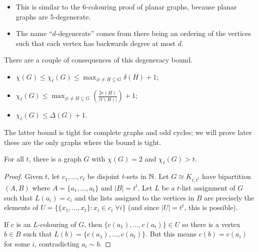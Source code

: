 \documentclass[main.tex]{subfiles}
\begin{document}
\begin{remark*}
  \listhack
  \begin{itemize}
    \item This is similar to the 6-colouring proof of planar graphs,
      because planar graphs are 5-degenerate.

    \item The name ``$d$-degenerate'' comes from there being an ordering of
      the vertices such that each vertex has backwards degree at most $d$.
  \end{itemize}
\end{remark*}
There are a couple of consequences of this degeneracy bound.
\begin{corollary}
  \listhack
  \begin{itemize}
    \item $\chi(G)\leq\chi_\ell(G)\leq\max_{\varnothing\neq H\subseteq G}\delta(H) + 1$;

    \item $\chi_\ell(G)\leq\max_{\varnothing\neq H\subseteq G}
      \left(\frac{2e(H)}{|V(H)|}\right)+1$; 

    \item $\chi_\ell(G)\leq\Delta(G) + 1$.
  \end{itemize}
\end{corollary}
The latter bound is tight for complete graphs and odd cycles;
we will prove later these are the only graphs where the bound is tight.

\begin{theorem} %
  For all $t$, there is a graph $G$ with $\chi(G) = 2$ and $\chi_\ell(G) > t$.
\end{theorem}
\begin{proof}
  Given $t$, let $c_1,\ldots,c_t$ be disjoint $t$-sets in $\mathbb N$.
  Let $G\cong K_{t,t^t}$ have bipartition $(A,B)$ where $A = \{a_1,\ldots,a_t\}$
  and $|B| = t^t$.
  Let $L$ be a $t$-list assignment of $G$ such that $L(a_i) = c_i$ and the lists
  assigned to the vertices in $B$ are precisely the elements of
  $U = \{\{x_1,\ldots,x_t\} : x_i\in c_i\;\forall i\}$ (and since $|U| = t^t$,
  this is possible).

  If $c$ is an $L$-colouring of $G$, then $\{c(a_1),\ldots,c(a_t)\}\in U$
  so there is a vertex $b\in B$ such that $L(b) = \{c(a_1), \ldots, c(a_t)\}$.
  But this means $c(b) = c(a_i)$ for some $i$, contradicting $a_i\sim b$.
\end{proof}
\end{document}
